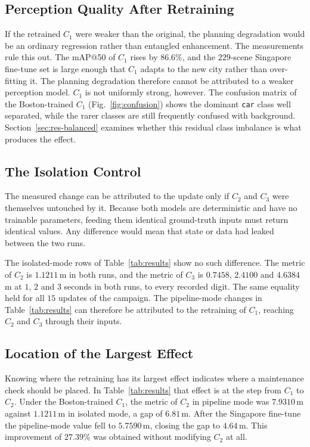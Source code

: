 \documentclass[conference]{IEEEtran}
\begin{document}
\subsection{Perception Quality After Retraining}
\label{sec:res-decouple}
If the retrained $C_1$ were weaker than the original, the planning degradation
would be an ordinary regression rather than entangled enhancement. The
measurements rule this out. The mAP@50 of $C_1$ rises by $86.6\%$, and the
$229$-scene Singapore fine-tune set is large enough that $C_1$ adapts to
the new city rather than over-fitting it. The planning degradation therefore
cannot be attributed to a weaker perception model. $C_1$ is not uniformly
strong, however. The confusion matrix of the
Boston-trained $C_1$ (Fig.~\ref{fig:confusion}) shows the dominant \texttt{car}
class well separated, while the rarer classes are still frequently confused with
background. Section~\ref{sec:res-balanced} examines whether this residual class
imbalance is what produces the effect.

\subsection{The Isolation Control}
\label{sec:res-iso}
The measured change can be attributed to the update only if $C_2$ and $C_3$ were
themselves untouched by it. Because both models are deterministic and have no
trainable parameters, feeding them identical ground-truth inputs must return
identical values. Any difference would mean that state or data had leaked between
the two runs.

The isolated-mode rows of Table~\ref{tab:results} show no such difference. The
metric of $C_2$ is $1.1211$\,m in both runs, and the metric of $C_3$ is
$0.7458$, $2.4100$ and $4.6384$\,m at $1$, $2$ and $3$ seconds in both runs, to
every recorded digit. The same equality held for all $15$ updates of the
campaign. The pipeline-mode changes in Table~\ref{tab:results} can therefore be
attributed to the retraining of $C_1$, reaching $C_2$ and $C_3$ through their
inputs.

\subsection{Location of the Largest Effect}
\label{sec:res-interface}
Knowing where the retraining has its largest effect indicates where a maintenance
check should be placed. In Table~\ref{tab:results} that effect is at the step
from $C_1$ to $C_2$. Under the Boston-trained $C_1$, the metric of $C_2$ in
pipeline mode was $7.9310$\,m against $1.1211$\,m in isolated mode, a gap of
$6.81$\,m. After the Singapore fine-tune the pipeline-mode value fell to
$5.7590$\,m, closing the gap to $4.64$\,m. This improvement of $27.39\%$ was
obtained without modifying $C_2$ at all.
\end{document}
